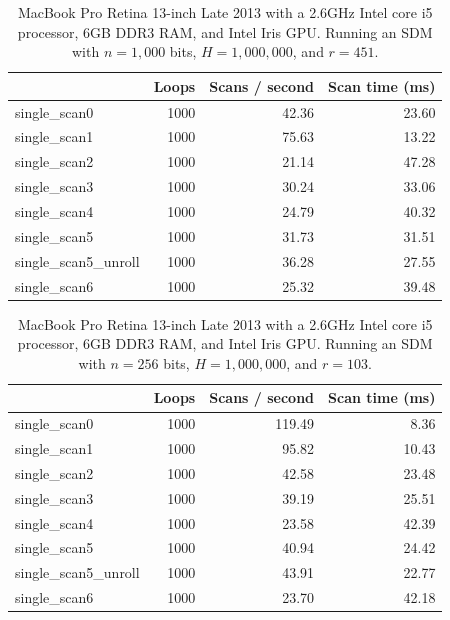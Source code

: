 \begin{table}[!htb]
\centering
\begin{tabular}{| l | r | r | r |}
    \hline
    & Loops & Scans / second & Scan time (ms) \\ \hline
    single\_scan0 & 1000 & 42.36 & 23.60 \\
    single\_scan1 & 1000 & 75.63 & 13.22 \\
    single\_scan2 & 1000 & 21.14 & 47.28 \\
    single\_scan3 & 1000 & 30.24 & 33.06 \\
    single\_scan4 & 1000 & 24.79 & 40.32 \\
    single\_scan5 & 1000 & 31.73 & 31.51 \\
    single\_scan5\_unroll & 1000 & 36.28 & 27.55 \\
    single\_scan6 & 1000 & 25.32 & 39.48 \\
    \hline
\end{tabular}
\caption{MacBook Pro Retina 13-inch Late 2013 with a 2.6GHz Intel core i5 processor, 6GB DDR3 RAM, and Intel Iris GPU. Running an SDM with $n=1,000$ bits, $H=1,000,000$, and $r=451$.
\label{tab:perf-macbook-kernels-1000}}
\end{table}

\begin{table}[!htb]
\centering
\begin{tabular}{| l | r | r | r |}
    \hline
    & Loops & Scans / second & Scan time (ms) \\ \hline
    single\_scan0 & 1000 & 119.49 & 8.36 \\
    single\_scan1 & 1000 & 95.82 & 10.43 \\
    single\_scan2 & 1000 & 42.58 & 23.48 \\
    single\_scan3 & 1000 & 39.19 & 25.51 \\
    single\_scan4 & 1000 & 23.58 & 42.39 \\
    single\_scan5 & 1000 & 40.94 & 24.42 \\
    single\_scan5\_unroll & 1000 & 43.91 & 22.77 \\
    single\_scan6 & 1000 & 23.70 & 42.18 \\
    \hline
\end{tabular}
\caption{MacBook Pro Retina 13-inch Late 2013 with a 2.6GHz Intel core i5 processor, 6GB DDR3 RAM, and Intel Iris GPU. Running an SDM with $n=256$ bits, $H=1,000,000$, and $r=103$.
\label{tab:perf-macbook-kernels-256}}
\end{table}

